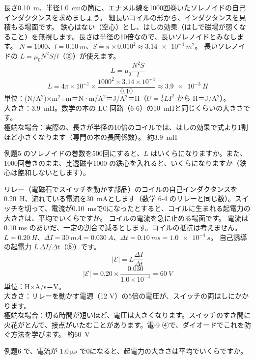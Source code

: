 \label{ph:電-8:ex5}
\begin{phreidai}[ソレノイドのインダクタンス]
長さ\qty{0.10}{m}、半径\qty{1.0}{cm}の筒に、エナメル線を1000回巻いたソレノイドの自己インダクタンスを求めましょう。
\phbamen
細長いコイルの形から、インダクタンスを見積もる場面です。
\phmushi
鉄心はない（空心）とし、はしの効果（はしで磁場が弱くなること）を無視します。長さは半径の10倍なので、長いソレノイドとみなします。
\phzu
$N=1000$、$l=\qty{0.10}{m}$、$S=\pi\times0.010^2\approx\qty{3.14e-4}{m^2}$。
\phriyu
長いソレノイドの $L=\mu_0N^2S/l$（⑥）が使えます。
\phtateru
\[ L=\mu_0\frac{N^2S}{l} \]
\phtoku
\[ L=4\pi\times10^{-7}\times\frac{1000^2\times3.14\times10^{-4}}{0.10}\approx\qty{3.9e-3}{H} \]
\phtashikame
単位：(N/A$^2$)×m$^2$÷m＝N·m/A$^2$＝J/A$^2$＝H（$U=\tfrac12LI^2$ から H＝J/A$^2$）。\\
大きさ：\qty{3.9}{mH}。数学の本の LC 回路（6-6）の\qty{10}{mH}と同じくらいの大きさです。\\
極端な場合：実際の、長さが半径の10倍のコイルでは、はしの効果で式より1割ほど小さくなります（専門の本の長岡係数）。
\kotae 約\qty{3.9}{mH}
\end{phreidai}
\begin{jibun}
例題5 のソレノイドの巻数を500回にすると、$L$ はいくらになりますか。また、1000回巻きのまま、比透磁率1000 の鉄心を入れると、いくらになりますか（鉄心は飽和しないとします）。
\end{jibun}

\label{ph:電-8:ex6}
\begin{phreidai}[リレーのコイルのスイッチを切る]
リレー（電磁石でスイッチを動かす部品）のコイルの自己インダクタンスを\qty{0.20}{H}、流れている電流を\qty{30}{mA}とします（数学 6-4 のリレーと同じ数）。スイッチを切って、電流が\qty{0.10}{ms}で0になったとすると、コイルに生まれる起電力の大きさは、平均でいくらですか。
\phbamen
コイルの電流を急に止める場面です。
\phmushi
電流は0.10 ms のあいだ、一定の割合で減るとします。コイルの抵抗は考えません。
\phzu
$L=\qty{0.20}{H}$、$\Delta I=\qty{30}{mA}=\qty{0.030}{A}$、$\Delta t=\qty{0.10}{ms}=\qty{1.0e-4}{s}$。
\phriyu
自己誘導の起電力 $L\,\Delta I/\Delta t$（⑥）です。
\phtateru
\[ |\mathcal E|=L\frac{\Delta I}{\Delta t} \]
\phtoku
\[ |\mathcal E|=0.20\times\frac{0.030}{1.0\times10^{-4}}=\qty{60}{V} \]
\phtashikame
単位：H×A/s＝V。\\
大きさ：リレーを動かす電源（12 V）の5倍の電圧が、スイッチの両はしにかかります。\\
極端な場合：切る時間が短いほど、電圧は大きくなります。スイッチのすき間に火花がとんで、接点がいたむことがあります。電-9 ④で、ダイオードでこれを防ぐ方法を学びます。
\kotae 約\qty{60}{V}
\end{phreidai}
\begin{jibun}
例題6 で、電流が $\qty{1.0}{\micro s}$ で0になると、起電力の大きさは平均でいくらですか。
\end{jibun}

